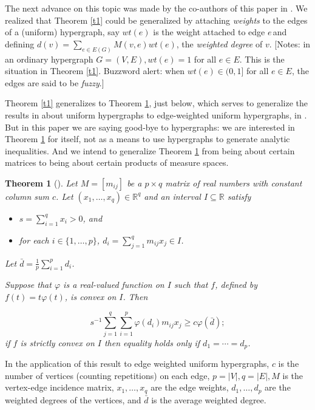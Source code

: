 \documentclass[final,1p,times]{elsarticle}
\newtheorem{thm}{Theorem}[section]
\begin{document}
The next advance on this topic was made by the co-authors of this paper in \cite {PJ}.  We realized that Theorem \ref {t1} could be generalized by attaching {\em weights} to the edges of a (uniform) hypergraph, say $wt(e)$ is the weight attached to edge $e$\,and defining $d(v) = \sum _{e \in E(G)} M(v, e) wt(e)$, the {\em weighted degree} of $v$.  [Notes: in an ordinary hypergraph $G = (V, E), wt(e) = 1$ for all $e \in E$.  This is the situation in Theorem \ref {t1}.  Buzzword alert: when $wt(e) \in (0, 1]$ for all $e \in E$, the edges are said to be {\em fuzzy}.]

Theorem \ref {t1} generalizes to Theorem \ref {t2}, just below, which serves to generalize the results in \cite {PJ} about uniform hypergraphs to edge-weighted uniform hypergraphs, in \cite {HL}.  But in this paper we are saying good-bye to hypergraphs:  we are interested in Theorem \ref {t2} for itself, not as a means to use hypergraphs to generate analytic inequalities.  And we intend to generalize Theorem \ref {t2} from being about certain matrices to being about certain products of measure spaces.

\begin{thm} [\cite {PJ}] \label {t2}
Let $M = [m_{ij}]$ be a $p \times q$ matrix of real numbers with constant column sum $c$.  Let $(x_1, \dots, x_q) \in \mathbb {R}^q$ and an interval $I \subseteq \mathbb {R}$ satisfy

\begin{itemize}
\item [(i)] $s = \sum _{i=1} ^q x_i > 0$, and
\item [(ii)] for each $i \in \{1, \dots, p\}$, $d_i = \sum _{j=1}^q m_{ij} x_j \in I$.
\end{itemize}
Let $\bar {d} = \frac {1}{p} \sum _{i=1}^p d_i$.

Suppose that $\varphi$ is a real-valued function on $I$ such that $f$, defined by $f(t) = t \varphi (t)$, is convex on $I$.  Then

$$
s^{-1} \sum _{j=1}^q \sum _{i=1}^p \varphi (d_i) m_{ij} x_j \geq c \varphi (\bar {d});
$$
if $f$ is strictly convex on $I$ then equality holds only if $d_1 = \cdots = d_p$.
\end{thm}

In the application of this result to edge weighted uniform hypergraphs, $c$ is the number of vertices (counting repetitions) on each edge, $p = |V|, q = |E|, M$ is the vertex-edge incidence matrix, $x_1, \dots, x_q$ are the edge weights, $d_1, \dots, d_p$ are the weighted degrees of the vertices, and $\bar {d}$ is the average weighted degree.
\end{document}
